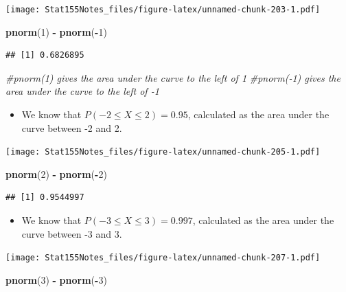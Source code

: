 \documentclass[]{book}
\newenvironment{Shaded}{\begin{snugshade}}{\end{snugshade}}
\newcommand{\CommentTok}[1]{\textcolor[rgb]{0.56,0.35,0.01}{\textit{#1}}}
\newcommand{\DecValTok}[1]{\textcolor[rgb]{0.00,0.00,0.81}{#1}}
\newcommand{\KeywordTok}[1]{\textcolor[rgb]{0.13,0.29,0.53}{\textbf{#1}}}
\newcommand{\NormalTok}[1]{#1}
\newcommand{\OperatorTok}[1]{\textcolor[rgb]{0.81,0.36,0.00}{\textbf{#1}}}
\newcommand{\StringTok}[1]{\textcolor[rgb]{0.31,0.60,0.02}{#1}}
\providecommand{\tightlist}{%
  \setlength{\itemsep}{0pt}\setlength{\parskip}{0pt}}
\begin{document}
\texttt{[image: Stat155Notes\_files/figure-latex/unnamed-chunk-203-1.pdf]}

\begin{Shaded}
\begin{Highlighting}[]
\KeywordTok{pnorm}\NormalTok{(}\DecValTok{1}\NormalTok{) }\OperatorTok{-}\StringTok{ }\KeywordTok{pnorm}\NormalTok{(}\OperatorTok{-}\DecValTok{1}\NormalTok{) }
\end{Highlighting}
\end{Shaded}

\begin{verbatim}
## [1] 0.6826895
\end{verbatim}

\begin{Shaded}
\begin{Highlighting}[]
\CommentTok{#pnorm(1) gives the area under the curve to the left of 1}
\CommentTok{#pnorm(-1) gives the area under the curve to the left of -1}
\end{Highlighting}
\end{Shaded}

\begin{itemize}
\tightlist
\item
  We know that \(P(-2\leq X \leq 2) = 0.95\), calculated as the area under the curve between -2 and 2.
\end{itemize}

\texttt{[image: Stat155Notes\_files/figure-latex/unnamed-chunk-205-1.pdf]}

\begin{Shaded}
\begin{Highlighting}[]
\KeywordTok{pnorm}\NormalTok{(}\DecValTok{2}\NormalTok{) }\OperatorTok{-}\StringTok{ }\KeywordTok{pnorm}\NormalTok{(}\OperatorTok{-}\DecValTok{2}\NormalTok{)}
\end{Highlighting}
\end{Shaded}

\begin{verbatim}
## [1] 0.9544997
\end{verbatim}

\begin{itemize}
\tightlist
\item
  We know that \(P(-3\leq X \leq 3) = 0.997\), calculated as the area under the curve between -3 and 3.
\end{itemize}

\texttt{[image: Stat155Notes\_files/figure-latex/unnamed-chunk-207-1.pdf]}

\begin{Shaded}
\begin{Highlighting}[]
\KeywordTok{pnorm}\NormalTok{(}\DecValTok{3}\NormalTok{) }\OperatorTok{-}\StringTok{ }\KeywordTok{pnorm}\NormalTok{(}\OperatorTok{-}\DecValTok{3}\NormalTok{)}
\end{Highlighting}
\end{Shaded}
\end{document}
